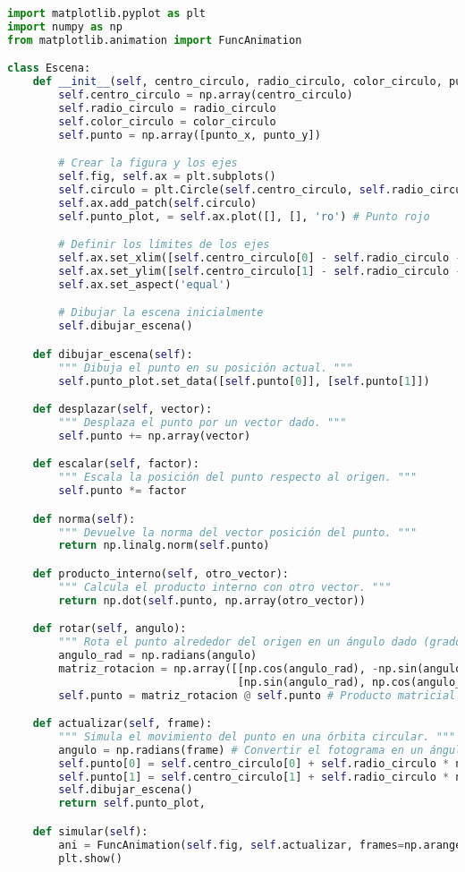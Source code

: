 \begin{lstlisting}[language=Python]
import matplotlib.pyplot as plt
import numpy as np
from matplotlib.animation import FuncAnimation

class Escena:
    def __init__(self, centro_circulo, radio_circulo, color_circulo, punto_x, punto_y):
        self.centro_circulo = np.array(centro_circulo)
        self.radio_circulo = radio_circulo
        self.color_circulo = color_circulo
        self.punto = np.array([punto_x, punto_y])

        # Crear la figura y los ejes
        self.fig, self.ax = plt.subplots()
        self.circulo = plt.Circle(self.centro_circulo, self.radio_circulo, color=self.color_circulo, fill=False)
        self.ax.add_patch(self.circulo)
        self.punto_plot, = self.ax.plot([], [], 'ro') # Punto rojo

        # Definir los límites de los ejes
        self.ax.set_xlim([self.centro_circulo[0] - self.radio_circulo - 1, self.centro_circulo[0] + self.radio_circulo + 1])
        self.ax.set_ylim([self.centro_circulo[1] - self.radio_circulo - 1, self.centro_circulo[1] + self.radio_circulo + 1])
        self.ax.set_aspect('equal')

        # Dibujar la escena inicialmente
        self.dibujar_escena()

    def dibujar_escena(self):
        """ Dibuja el punto en su posición actual. """
        self.punto_plot.set_data([self.punto[0]], [self.punto[1]])

    def desplazar(self, vector):
        """ Desplaza el punto por un vector dado. """
        self.punto += np.array(vector)

    def escalar(self, factor):
        """ Escala la posición del punto respecto al origen. """
        self.punto *= factor

    def norma(self):
        """ Devuelve la norma del vector posición del punto. """
        return np.linalg.norm(self.punto)

    def producto_interno(self, otro_vector):
        """ Calcula el producto interno con otro vector. """
        return np.dot(self.punto, np.array(otro_vector))

    def rotar(self, angulo):
        """ Rota el punto alrededor del origen en un ángulo dado (grados). """
        angulo_rad = np.radians(angulo)
        matriz_rotacion = np.array([[np.cos(angulo_rad), -np.sin(angulo_rad)],
                                    [np.sin(angulo_rad), np.cos(angulo_rad)]])
        self.punto = matriz_rotacion @ self.punto # Producto matricial

    def actualizar(self, frame):
        """ Simula el movimiento del punto en una órbita circular. """
        angulo = np.radians(frame) # Convertir el fotograma en un ángulo
        self.punto[0] = self.centro_circulo[0] + self.radio_circulo * np.cos(angulo)
        self.punto[1] = self.centro_circulo[1] + self.radio_circulo * np.sin(angulo)
        self.dibujar_escena()
        return self.punto_plot,

    def simular(self):
        ani = FuncAnimation(self.fig, self.actualizar, frames=np.arange(0, 360, 5), interval=50)
        plt.show()
\end{lstlisting}

